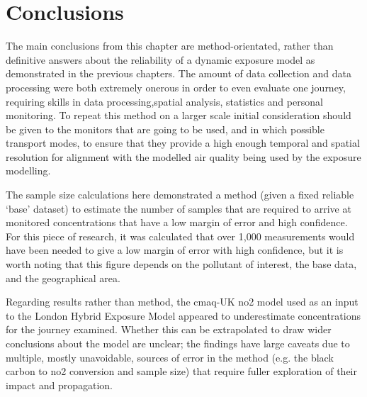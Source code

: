 \section{Conclusions}
\label{sec:4conclusions}

The main conclusions from this chapter are method-orientated, rather than definitive answers about the reliability of a dynamic exposure model as demonstrated in the previous chapters. The amount of data collection and data processing were both extremely onerous in order to even evaluate one journey, requiring skills in data processing,spatial analysis, statistics and personal monitoring. To repeat this method on a larger scale initial consideration should be given to the monitors that are going to be used, and in which possible transport modes, to ensure that they provide a high enough temporal and spatial resolution for alignment with the modelled air quality being used by the exposure modelling.

The sample size calculations here demonstrated a method (given a fixed reliable ‘base’ dataset) to estimate the number of samples that are required to arrive at monitored concentrations that have a low margin of error and high confidence. For this piece of research, it was calculated that over 1,000 measurements would have been needed to give a low margin of error with high confidence, but it is worth noting that this figure depends on the pollutant of interest, the base data, and the geographical area.

Regarding results rather than method, the \gls{cmaq}-UK \gls{no2} model used as an input to the London Hybrid Exposure Model appeared to underestimate concentrations for the journey examined. Whether this can be extrapolated to draw wider conclusions about the model are unclear; the findings have large caveats due to multiple, mostly unavoidable, sources of error in the method (e.g. the black carbon to \gls{no2} conversion and sample size) that require fuller exploration of their impact and propagation.


